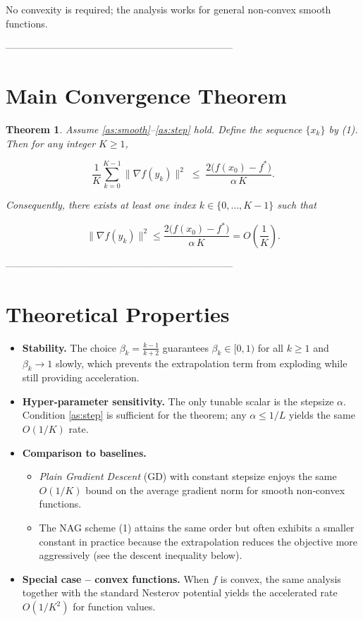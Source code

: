 \documentclass[11pt]{article}
\newtheorem{theorem}{Theorem}
\newcommand{\grad}{\nabla}
\begin{document}
No convexity is required; the analysis works for general non‑convex smooth functions.

---------------------------------------------------------------------

\section*{Main Convergence Theorem}
\begin{theorem}\label{thm:main}
Assume \ref{as:smooth}–\ref{as:step} hold.  
Define the sequence \(\{x_k\}\) by (1). Then for any integer \(K\ge 1\),

\[
\frac{1}{K}\sum_{k=0}^{K-1}\bigl\|\grad f(y_k)\bigr\|^{2}
\;\le\;
\frac{2\bigl(f(x_0)-f^{*}\bigr)}{\alpha\,K}.
\tag{4}
\]

Consequently, there exists at least one index \(k\in\{0,\dots,K-1\}\) such that  

\[
\bigl\|\grad f(y_k)\bigr\|^{2}\le
\frac{2\bigl(f(x_0)-f^{*}\bigr)}{\alpha\,K}=O\!\left(\frac{1}{K}\right).
\]
\end{theorem}

---------------------------------------------------------------------

\section*{Theoretical Properties}
\begin{itemize}
\item \textbf{Stability.} The choice \(\beta_k=\frac{k-1}{k+2}\) guarantees \(\beta_k\in[0,1)\) for all \(k\ge1\) and \(\beta_k\to1\) slowly, which prevents the extrapolation term from exploding while still providing acceleration.
\item \textbf{Hyper‑parameter sensitivity.} The only tunable scalar is the stepsize \(\alpha\). Condition \eqref{as:step} is sufficient for the theorem; any \(\alpha\le 1/L\) yields the same \(O(1/K)\) rate.
\item \textbf{Comparison to baselines.}
    \begin{itemize}
        \item \emph{Plain Gradient Descent} (GD) with constant stepsize enjoys the same \(O(1/K)\) bound on the average gradient norm for smooth non‑convex functions.
        \item The NAG scheme (1) attains the same order but often exhibits a smaller constant in practice because the extrapolation reduces the objective more aggressively (see the descent inequality below).
    \end{itemize}
\item \textbf{Special case – convex functions.} When \(f\) is convex, the same analysis together with the standard Nesterov potential yields the accelerated rate \(O(1/K^{2})\) for function values.  
\end{itemize}
\end{document}
